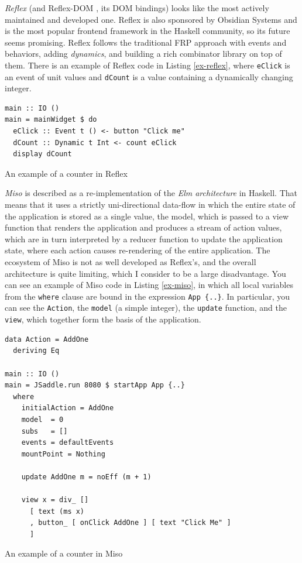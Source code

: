 \documentclass[english,zadani,odsaz]{fitthesis}
\begin{document}
\emph{Reflex} \cite{reflex} (and Reflex-DOM \cite{reflex-dom}, its DOM bindings) looks like
the most actively maintained and developed one. Reflex is also sponsored by
Obsidian Systems \cite{obsidian} and is the most popular frontend framework in the
Haskell community, so its future seems promising. Reflex follows the traditional
FRP approach with events and behaviors, adding \emph{dynamics}, and building a rich
combinator library on top of them. There is an example of Reflex code in Listing
\ref{ex-reflex}, where \texttt{eClick} is an event of unit values and \texttt{dCount} is a value
containing a dynamically changing integer.

\begin{listing}[tb]
\begin{verbatim}
main :: IO ()
main = mainWidget $ do
  eClick :: Event t () <- button "Click me"
  dCount :: Dynamic t Int <- count eClick
  display dCount
\end{verbatim}
\caption{An example of a counter in Reflex \label{ex-reflex}}
\end{listing}

\emph{Miso} \cite{miso} is described as a re-implementation of the \emph{Elm architecture} in
Haskell. That means that it uses a strictly uni-directional data-flow in which
the entire state of the application is stored as a single value, the model,
which is passed to a view function that renders the application and produces a
stream of action values, which are in turn interpreted by a reducer function to
update the application state, where each action causes re-rendering of the
entire application. The ecosystem of Miso is not as well developed as Reflex's,
and the overall architecture is quite limiting, which I consider to be a large
disadvantage. You can see an example of Miso code in Listing \ref{ex-miso}, in
which all local variables from the \texttt{where} clause are bound in the expression \texttt{App
\{..\}}. In particular, you can see the \texttt{Action}, the \texttt{model} (a simple integer), the
\texttt{update} function, and the \texttt{view}, which together form the basis of the application.

\begin{listing}[!bp]
\begin{verbatim}
data Action = AddOne
  deriving Eq

main :: IO ()
main = JSaddle.run 8080 $ startApp App {..}
  where
    initialAction = AddOne
    model  = 0
    subs   = []
    events = defaultEvents
    mountPoint = Nothing

    update AddOne m = noEff (m + 1)

    view x = div_ []
      [ text (ms x)
      , button_ [ onClick AddOne ] [ text "Click Me" ]
      ]
\end{verbatim}
\caption{An example of a counter in Miso \label{ex-miso}}
\end{listing}
\end{document}
